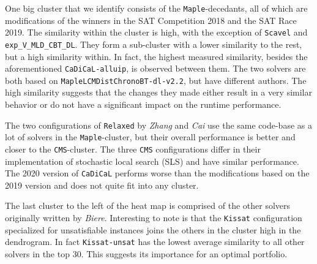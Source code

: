 \documentclass{elsarticle}
\newcommand{\solver}[1]{\texttt{#1}}
\begin{document}
One big cluster that we identify consists of the \solver{Maple}-decedants, 
all of which are modifications of the winners in the SAT Competition 2018 and
the SAT Race 2019.
The similarity within the cluster is high, with the exception of
\solver{Scavel} and \solver{exp\_V\_MLD\_CBT\_DL}.
They form a sub-cluster
with a lower similarity to the rest, but a high similarity within. In fact, the highest measured similarity,
besides the aforementioned \solver{CaDiCaL-alluip}, is observed between them.
The two solvers are both based on
\solver{MapleLCMDistChronoBT-dl-v2.2}, but have different authors.
The high similarity suggests that the
changes they made either result in a very similar behavior or do not have a
significant impact on the runtime performance.

The two configurations of \solver{Relaxed} by \emph{Zhang} and \emph{Cai}
use the same code-base as a lot of solvers in the \solver{Maple}-cluster, but their
overall performance is better and closer to the \solver{CMS}-cluster.
The three \solver{CMS} configurations
differ in their implementation of stochastic local search
(SLS) and have similar performance.
The 2020 version of \solver{CaDiCaL}
performs worse than the modifications based on the 2019 version and
does not quite fit into any cluster.

The last cluster to the left of the heat map is comprised of the other solvers
originally written by \emph{Biere}. Interesting to note is that the
\solver{Kissat} configuration specialized for unsatisfiable instances joins the
others in the cluster high in the dendrogram. In fact \solver{Kissat-unsat} has
the lowest average similarity to all other solvers in the top 30.
This suggests its importance for an optimal
portfolio.

\end{document}
